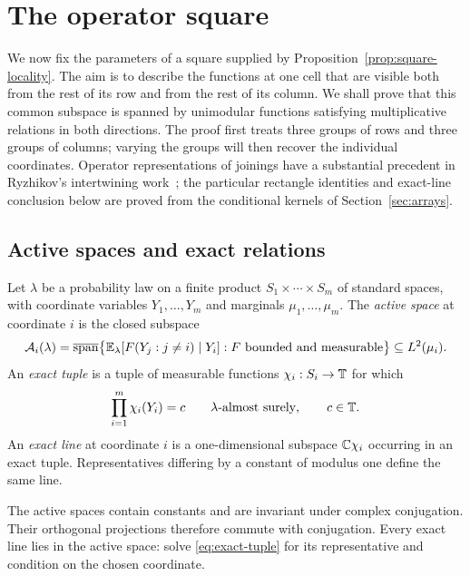 \section{The operator square}
\label{sec:operators}

We now fix the parameters of a square supplied by
Proposition~\ref{prop:square-locality}.  The aim is to describe the functions
at one cell that are visible both from the rest of its row and from the rest
of its column.  We shall prove that this common subspace is spanned by
unimodular functions satisfying multiplicative relations in both directions.
The proof first treats three groups of rows and three groups of columns;
varying the groups will then recover the individual coordinates.
Operator representations of joinings have a substantial precedent in
Ryzhikov's intertwining work~\cite{Ryzhikov1994,Ryzhikov1997}; the
particular rectangle identities and exact-line conclusion below are
proved from the conditional kernels of Section~\ref{sec:arrays}.

\subsection{Active spaces and exact relations}

\begin{definition}\label{def:active-space}
Let $\lambda$ be a probability law on a finite product
$S_1\times\cdots\times S_m$ of standard spaces, with coordinate variables
$Y_1,\ldots,Y_m$ and marginals $\mu_1,\ldots,\mu_m$.
The \emph{active space} at coordinate $i$ is the closed subspace
\[
 \mathcal A_i(\lambda)
 =\overline{\operatorname{span}}\bigl\{
   \mathbb E_\lambda[F(Y_j:j\ne i)\mid Y_i]:F\text{ bounded and measurable}
 \bigr\}\subseteq L^2(\mu_i).
\]
An \emph{exact tuple} is a tuple of measurable functions
$\chi_i:S_i\to\mathbb T$ for which
\begin{equation}\label{eq:exact-tuple}
 \prod_{i=1}^m\chi_i(Y_i)=c\qquad\lambda\text{-almost surely},
 \qquad c\in\mathbb T.
\end{equation}
An \emph{exact line} at coordinate $i$ is a one-dimensional subspace
$\mathbb C\chi_i$ occurring in an exact tuple.  Representatives differing by a
constant of modulus one define the same line.
\end{definition}

The active spaces contain constants and are invariant under complex
conjugation.  Their orthogonal projections therefore commute with
conjugation.  Every exact line lies in the active space: solve
\eqref{eq:exact-tuple} for its representative and condition on the chosen
coordinate.

